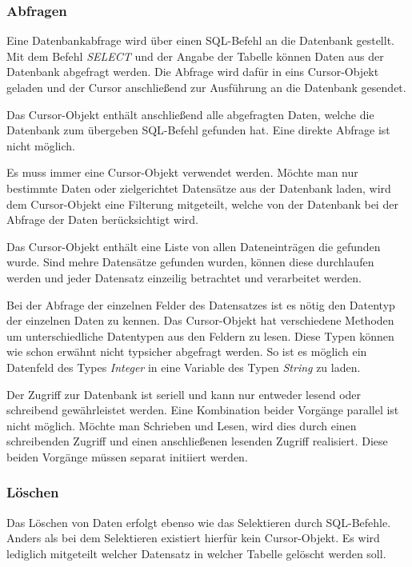 \subsubsection{Abfragen}

Eine Datenbankabfrage wird über einen SQL-Befehl an die Datenbank gestellt. Mit dem Befehl \textit{SELECT} und der Angabe der Tabelle können Daten aus der Datenbank abgefragt werden. Die Abfrage wird dafür in eins Cursor-Objekt geladen und der Cursor anschließend zur Ausführung an die Datenbank gesendet.

Das Cursor-Objekt enthält anschließend alle abgefragten Daten, welche die Datenbank zum übergeben SQL-Befehl gefunden hat. Eine direkte Abfrage ist nicht möglich.

Es muss immer eine Cursor-Objekt verwendet werden. Möchte man nur bestimmte Daten oder zielgerichtet Datensätze aus der Datenbank laden, wird dem Cursor-Objekt eine Filterung mitgeteilt, welche von der Datenbank bei der Abfrage der Daten berücksichtigt wird.

Das Cursor-Objekt enthält eine Liste von allen Dateneinträgen die gefunden wurde. Sind mehre Datensätze gefunden wurden, können diese durchlaufen werden und jeder Datensatz einzeilig betrachtet und verarbeitet werden.

Bei der Abfrage der einzelnen Felder des Datensatzes ist es nötig den Datentyp der einzelnen Daten zu kennen. Das Cursor-Objekt hat verschiedene Methoden um unterschiedliche Datentypen aus den Feldern zu lesen. Diese Typen können wie schon erwähnt nicht typsicher abgefragt werden. So ist es möglich ein Datenfeld des Types \textit{Integer} in eine Variable des Typen \textit{String} zu laden.

Der Zugriff zur Datenbank ist seriell und kann nur entweder lesend oder schreibend gewährleistet werden. Eine Kombination beider Vorgänge parallel ist nicht möglich. Möchte man Schrieben und Lesen, wird dies durch einen schreibenden Zugriff und einen anschließenen lesenden Zugriff realisiert. Diese beiden Vorgänge müssen separat initiiert werden.

\subsubsection{Löschen}

Das Löschen von Daten erfolgt ebenso wie das Selektieren durch SQL-Befehle. Anders als bei dem Selektieren existiert hierfür kein Cursor-Objekt. Es wird lediglich mitgeteilt welcher Datensatz in welcher Tabelle gelöscht werden soll.


